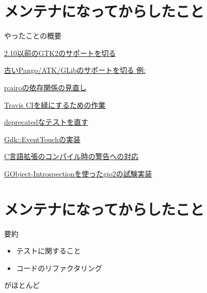 \section{メンテナになってからしたこと}

\begin{frame}
\begin{block}{やったことの概要}
\begin{itemize}
{\Large
\item
  \href{https://github.com/ruby-gnome2/ruby-gnome2/issues/182}{2.10以前のGTK2のサポートを切る }
\item
  \href{https://github.com/ruby-gnome2/ruby-gnome2/issues/190}{古いPango/ATK/GLibのサポートを切る 例:}
\item
  \href{https://github.com/ruby-gnome2/ruby-gnome2/issues/193}{rcairoの依存関係の見直し }
\item
  \href{https://github.com/ruby-gnome2/ruby-gnome2/issues/200}{Travis CIを緑にするための作業 }
\item
  \href{https://github.com/ruby-gnome2/ruby-gnome2/issues/202}{deprecatedなテストを直す }
\item
  \href{https://github.com/ruby-gnome2/ruby-gnome2/issues/194}{Gdk::EventTouchの実装 }
\item
  \href{https://github.com/ruby-gnome2/ruby-gnome2/pull/205}{C言語拡張のコンパイル時の警告への対応 }
\item
  \href{https://github.com/ruby-gnome2/ruby-gnome2/commit/79f6b15b207371360e7bef73813f60a03cd52f2e}{GObject-Introspectionを使ったgio2の試験実装 }
}
\end{itemize}
\end{block}
\end{frame}

\section{メンテナになってからしたこと}
\begin{frame}
\begin{block}{要約}
{\Large
\begin{itemize}
\item テストに関すること
\item コードのリファクタリング
\end{itemize}
}
\end{block}
{\huge
がほとんど
}
\end{frame}
